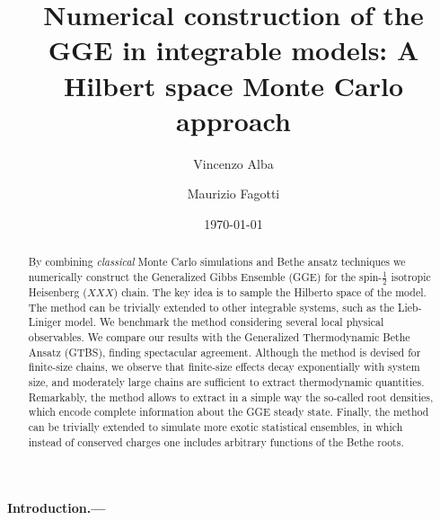 \documentclass[twocolumn,superscriptaddress,prb,10pt]{revtex4-1}
\begin{document}
\title{Numerical construction of the GGE in integrable models: A Hilbert space Monte Carlo 
approach} 

\author{Vincenzo Alba}

\author{Maurizio Fagotti}

\date{\today}




\begin{abstract} 

By combining {\it classical} Monte Carlo simulations and Bethe ansatz techniques we numerically 
construct the Generalized Gibbs Ensemble (GGE) for the spin-$\frac{1}{2}$ isotropic Heisenberg ($XXX$) chain. The key 
idea is to sample the Hilberto space of the model. The method can be trivially extended to other 
integrable systems, such as the Lieb-Liniger model. We benchmark the method considering several 
local physical observables. We compare our results with the Generalized Thermodynamic Bethe Ansatz 
(GTBS), finding spectacular agreement. Although the method is devised for finite-size chains, we 
observe that finite-size effects decay exponentially 
with system size, and moderately large chains are sufficient to extract thermodynamic quantities. 
Remarkably, the method allows to extract in a simple way the so-called root densities, which 
encode complete information about the GGE steady state. Finally, the method can be trivially 
extended to simulate more exotic statistical ensembles, in which instead of conserved charges one 
includes arbitrary functions of the Bethe roots. 

\end{abstract}


\maketitle


\paragraph*{Introduction.---}
\end{document}
